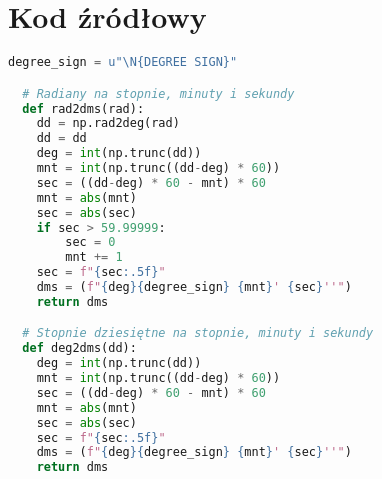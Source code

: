 \documentclass[fleqn,10pt,a4paper]{article}
\begin{document}
\newpage
\section{Kod źródłowy}

\begin{lstlisting}[language=Python, caption=Zamiany jednostek kątowych, label = kod:katy, style = mycode]
  degree_sign = u"\N{DEGREE SIGN}"

  # Radiany na stopnie, minuty i sekundy
  def rad2dms(rad):
    dd = np.rad2deg(rad)
    dd = dd
    deg = int(np.trunc(dd))
    mnt = int(np.trunc((dd-deg) * 60))
    sec = ((dd-deg) * 60 - mnt) * 60
    mnt = abs(mnt)
    sec = abs(sec)
    if sec > 59.99999:
        sec = 0
        mnt += 1
    sec = f"{sec:.5f}"
    dms = (f"{deg}{degree_sign} {mnt}' {sec}''")
    return dms

  # Stopnie dziesiętne na stopnie, minuty i sekundy
  def deg2dms(dd):
    deg = int(np.trunc(dd))
    mnt = int(np.trunc((dd-deg) * 60))
    sec = ((dd-deg) * 60 - mnt) * 60
    mnt = abs(mnt)
    sec = abs(sec)
    sec = f"{sec:.5f}"
    dms = (f"{deg}{degree_sign} {mnt}' {sec}''")
    return dms
\end{lstlisting}
\end{document}

